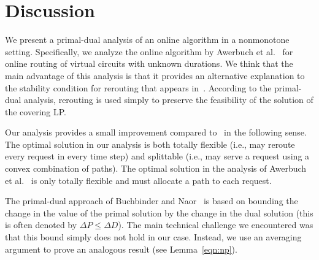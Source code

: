 \documentclass[11pt]{article}
\newenvironment{proof sketch}[1]{\noindent {\emph{Proof sketch of #1:}}}{\hfill \qed}
\begin{document}
\section{Discussion}
We present a primal-dual analysis of an online algorithm in a
nonmonotone setting. Specifically, we analyze the online algorithm by
Awerbuch et al.~\cite{awerbuch2001competitive} for online routing of
virtual circuits with unknown durations.  We think that the main
advantage of this analysis is that it provides an alternative
explanation to the stability condition for rerouting that appears
in~\cite{awerbuch2001competitive}.  According to the primal-dual
analysis, rerouting is used simply to preserve the feasibility of the
solution of the covering LP.

Our analysis provides a small improvement compared
to~\cite{awerbuch2001competitive} in the following sense.  The optimal
solution in our analysis is both totally flexible (i.e., may
reroute every request in every time step) and splittable (i.e., may
serve a request using a convex combination of paths). The optimal
solution in the analysis of Awerbuch et
al.~\cite{awerbuch2001competitive} is only totally flexible and must
allocate a path to each request.

The primal-dual approach of Buchbinder and Naor~\cite{BNsurvey} is
based on bounding the change in the value of the primal solution by
the change in the dual solution (this is often denoted by $\Delta P
\leq \Delta D$). The main technical challenge we encountered was that
this bound simply does not hold in our case. Instead, we use an
averaging argument to prove an analogous result (see Lemma~\ref{eqn:np}).




\end{document}
